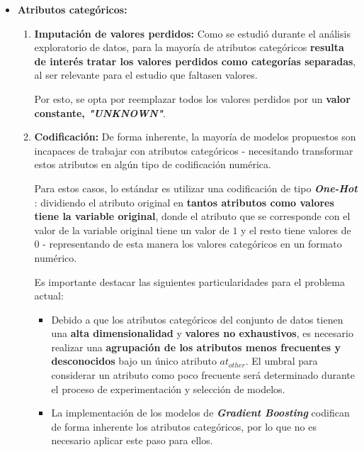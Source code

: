 \begin{itemize}[leftmargin=*, parsep=1pt, itemsep=1pt, topsep=4pt]
	\item \textbf{Atributos categóricos:}
	
	\begin{enumerate}
		\item \textbf{Imputación de valores perdidos:} Como se estudió durante el análisis exploratorio de datos, para la mayoría de atributos categóricos \textbf{resulta de interés tratar los valores perdidos como categorías separadas}, al ser relevante para el estudio que faltasen valores.
		
		Por esto, se opta por reemplazar todos los valores perdidos por un \textbf{valor constante, \textit{"UNKNOWN"}}.
		
		\item \textbf{Codificación:} De forma inherente, la mayoría de modelos propuestos son incapaces de trabajar con atributos categóricos - necesitando transformar estos atributos en algún tipo de codificación numérica.
		
		Para estos casos, lo estándar es utilizar una codificación de tipo \textbf{\textit{One-Hot}} \cite{GVK022791892}: dividiendo el atributo original en \textbf{tantos atributos como valores tiene la variable original}, donde el atributo que se corresponde con el valor de la variable original tiene un valor de $1$ y el resto tiene valores de $0$ - representando de esta manera los valores categóricos en un formato numérico.
		
		Es importante destacar las siguientes particularidades para el problema actual:
		\begin{itemize}
			\item Debido a que los atributos categóricos del conjunto de datos tienen una \textbf{alta dimensionalidad} y \textbf{valores no exhaustivos}, es necesario realizar una \textbf{agrupación de los atributos menos frecuentes y desconocidos} bajo un único atributo $at_{other}$. El umbral para considerar un atributo como poco frecuente será determinado durante el proceso de experimentación y selección de modelos.
			\item La implementación de los modelos de \textbf{\textit{Gradient Boosting}} codifican de forma inherente los atributos categóricos, por lo que no es necesario aplicar este paso para ellos.
		\end{itemize}
		 
	\end{enumerate}
	

\end{itemize}
